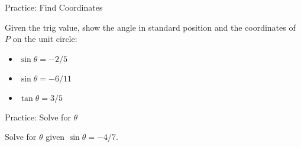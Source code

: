 \documentclass[aspectratio=169]{beamer}
\begin{document}
\begin{frame}{Practice: Find Coordinates}
    \begin{tcolorbox}[colback=lightgray,colframe=accent,title=Practice]
        \footnotesize
        Given the trig value, show the angle in standard position and the coordinates of $P$ on the unit circle:
        \begin{itemize}
            \item $\sin\theta = -2/5$
            \item $\sin\theta = -6/11$
            \item $\tan\theta = 3/5$
        \end{itemize}
    \end{tcolorbox}
\end{frame}

\begin{frame}{Practice: Solve for $\theta$}
    \begin{tcolorbox}[colback=lightgray,colframe=accent,title=Practice]
        \footnotesize
        Solve for $\theta$ given $\sin\theta = -4/7$.
    \end{tcolorbox}
\end{frame}
\end{document}
